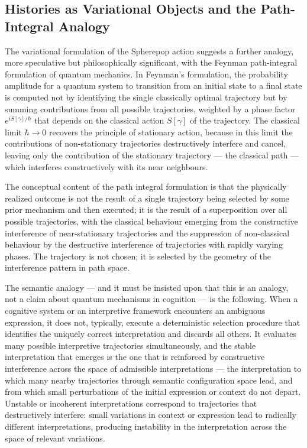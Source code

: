 \documentclass[12pt,openany]{book}
\theoremstyle{plain}
\theoremstyle{definition}
\theoremstyle{remark}
\begin{document}
\subsection{Histories as Variational Objects and the Path-Integral Analogy}

The variational formulation of the Spherepop action suggests a further analogy, more speculative but philosophically significant, with the Feynman path-integral formulation of quantum mechanics. In Feynman's formulation, the probability amplitude for a quantum system to transition from an initial state to a final state is computed not by identifying the single classically optimal trajectory but by summing contributions from all possible trajectories, weighted by a phase factor $e^{iS[\gamma]/\hbar}$ that depends on the classical action $S[\gamma]$ of the trajectory. The classical limit $\hbar \to 0$ recovers the principle of stationary action, because in this limit the contributions of non-stationary trajectories destructively interfere and cancel, leaving only the contribution of the stationary trajectory — the classical path — which interferes constructively with its near neighbours.

The conceptual content of the path integral formulation is that the physically realized outcome is not the result of a single trajectory being selected by some prior mechanism and then executed; it is the result of a superposition over all possible trajectories, with the classical behaviour emerging from the constructive interference of near-stationary trajectories and the suppression of non-classical behaviour by the destructive interference of trajectories with rapidly varying phases. The trajectory is not chosen; it is selected by the geometry of the interference pattern in path space.

The semantic analogy — and it must be insisted upon that this is an analogy, not a claim about quantum mechanisms in cognition — is the following. When a cognitive system or an interpretive framework encounters an ambiguous expression, it does not, typically, execute a deterministic selection procedure that identifies the uniquely correct interpretation and discards all others. It evaluates many possible interpretive trajectories simultaneously, and the stable interpretation that emerges is the one that is reinforced by constructive interference across the space of admissible interpretations — the interpretation to which many nearby trajectories through semantic configuration space lead, and from which small perturbations of the initial expression or context do not depart. Unstable or incoherent interpretations correspond to trajectories that destructively interfere: small variations in context or expression lead to radically different interpretations, producing instability in the interpretation across the space of relevant variations.
\end{document}
